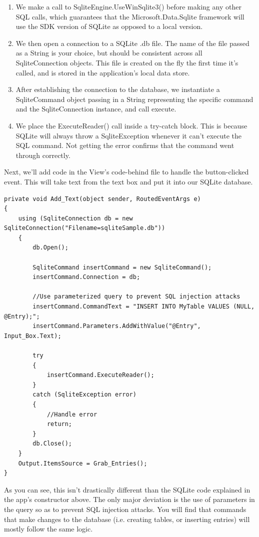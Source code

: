 \begin{enumerate}
	\item We make a call to SqliteEngine.UseWinSqlite3() before making any other SQL calls, which guarantees that the Microsoft.Data.Sqlite framework will use the SDK version of SQLite as opposed to a local version.
	\item We then open a connection to a SQLite .db file. The name of the file passed as a String is your choice, but should be consistent across all SqliteConnection objects. This file is created on the fly the first time it’s called, and is stored in the application’s local data store.
	\item After establishing the connection to the database, we instantiate a SqliteCommand object passing in a String representing the specific command and the SqliteConnection instance, and call execute.
	\item We place the ExecuteReader() call inside a try-catch block. This is because SQLite will always throw a SqliteException whenever it can’t execute the SQL command. Not getting the error confirms that the command went through correctly.
\end{enumerate}

Next, we’ll add code in the View’s code-behind file to handle the button-clicked event. This will take text from the text box and put it into our SQLite database.

\begin{lstlisting}[style=CSharpStyle]
private void Add_Text(object sender, RoutedEventArgs e)
{
	using (SqliteConnection db = new SqliteConnection("Filename=sqliteSample.db"))
	{
		db.Open();

		SqliteCommand insertCommand = new SqliteCommand();
		insertCommand.Connection = db;

		//Use parameterized query to prevent SQL injection attacks
		insertCommand.CommandText = "INSERT INTO MyTable VALUES (NULL, @Entry);";
		insertCommand.Parameters.AddWithValue("@Entry", Input_Box.Text);        

		try
		{
			insertCommand.ExecuteReader();
		}
		catch (SqliteException error)
		{
			//Handle error
			return;
		}
		db.Close();
	}
	Output.ItemsSource = Grab_Entries();
}
\end{lstlisting}

As you can see, this isn’t drastically different than the SQLite code explained in the app’s constructor above. The only major deviation is the use of parameters in the query so as to prevent SQL injection attacks. You will find that commands that make changes to the database (i.e. creating tables, or inserting entries) will mostly follow the same logic.

